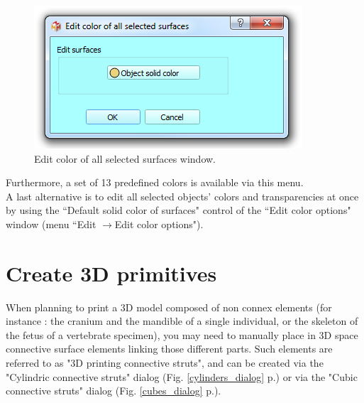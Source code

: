 \begin{figure}
  \centering
  \includegraphics[scale=0.21]{images/09/rendering/color.png} 
	\caption{ Edit color of all selected surfaces window. }
 \label{edit_color_of_all_selected_surfaces}
\end{figure}


Furthermore, a set of 13 predefined colors is available via this menu. \\

A last alternative is to edit all selected objects' colors and transparencies at once by using the ``Default solid color of surfaces" control of the ``Edit color options" window (menu ``Edit $\rightarrow$Edit color options"). 

\section{Create 3D primitives}

When planning to print a 3D model composed of non connex elements (for instance : the cranium and the mandible of a single individual, or the skeleton of the fetus of a vertebrate specimen), you may need to manually place in 3D space connective surface elements linking those different parts. Such elements are referred to as "3D printing connective struts", and can be created via the "Cylindric connective struts" dialog (Fig. \ref{cylinders_dialog} p.\pageref{cylinders_dialog}) or via the "Cubic connective struts" dialog (Fig. \ref{cubes_dialog} p.\pageref{cubes_dialog}). 

